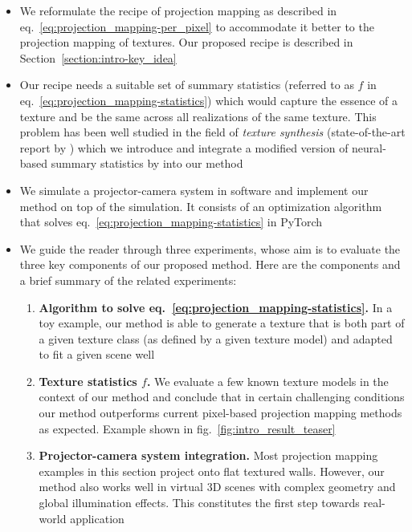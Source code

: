 \begin{itemize}
    \item We reformulate the recipe of projection mapping as described in eq.~\ref{eq:projection_mapping-per_pixel} to accommodate it better to the projection mapping of textures. Our proposed recipe is described in Section~\ref{section:intro-key_idea}
    \item Our recipe needs a suitable set of summary statistics (referred to as \(f\) in eq.~\ref{eq:projection_mapping-statistics}) which would capture the essence of a texture and be the same across all realizations of the same texture. This problem has been well studied in the field of \textit{texture synthesis} (state-of-the-art report by \citet{Raad2018}) which we introduce and integrate a modified version of neural-based summary statistics by \citet{Gatys2015} into our method
    \item We simulate a projector-camera system in software and implement our method on top of the simulation. It consists of an optimization algorithm that solves eq.~\ref{eq:projection_mapping-statistics} in PyTorch
    \item We guide the reader through three experiments, whose aim is to evaluate the three key components of our proposed method. Here are the components and a brief summary of the related experiments:
    \begin{enumerate}
        \item \textbf{Algorithm to solve eq.~\ref{eq:projection_mapping-statistics}.} In a toy example, our method is able to generate a texture that is both part of a given texture class (as defined by a given texture model) and adapted to fit a given scene well
        \item \textbf{Texture statistics \(f\).} We evaluate a few known texture models in the context of our method and conclude that in certain challenging conditions our method outperforms current pixel-based projection mapping methods as expected. Example shown in fig.~\ref{fig:intro_result_teaser}
        \item \textbf{Projector-camera system integration.} Most projection mapping examples in this section project onto flat textured walls. However, our method also works well in virtual 3D scenes with complex geometry and global illumination effects. This constitutes the first step towards real-world application
    \end{enumerate}
\end{itemize}

